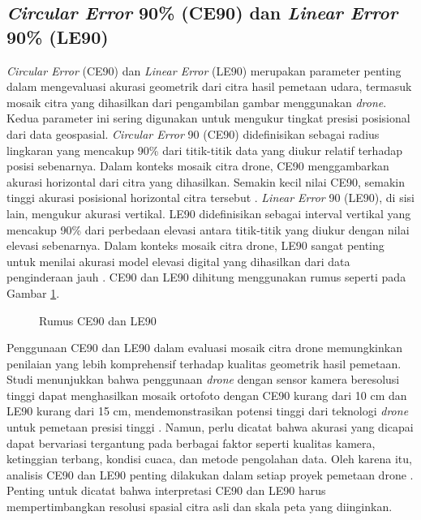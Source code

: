 \subsection{\textit{Circular Error} 90\% (CE90) dan \textit{Linear Error} 90\% (LE90)}

    \textit{Circular Error} (CE90) dan \textit{Linear Error} (LE90) merupakan parameter penting dalam mengevaluasi akurasi geometrik dari citra hasil pemetaan udara, termasuk mosaik citra yang dihasilkan dari pengambilan gambar menggunakan \textit{drone}. Kedua parameter ini sering digunakan untuk mengukur tingkat presisi posisional dari data geospasial. \textit{Circular Error} 90 (CE90) didefinisikan sebagai radius lingkaran yang mencakup 90\% dari titik-titik data yang diukur relatif terhadap posisi sebenarnya. Dalam konteks mosaik citra drone, CE90 menggambarkan akurasi horizontal dari citra yang dihasilkan. Semakin kecil nilai CE90, semakin tinggi akurasi posisional horizontal citra tersebut \citep{peppa2019photogrammetric}. \textit{Linear Error} 90 (LE90), di sisi lain, mengukur akurasi vertikal. LE90 didefinisikan sebagai interval vertikal yang mencakup 90\% dari perbedaan elevasi antara titik-titik yang diukur dengan nilai elevasi sebenarnya. Dalam konteks mosaik citra drone, LE90 sangat penting untuk menilai akurasi model elevasi digital yang dihasilkan dari data penginderaan jauh \citep{wolf2002elementary}. CE90 dan LE90 dihitung menggunakan rumus seperti pada Gambar \ref{rumus_ce}.

    \begin{figure}[H]
    \centering
    \caption{Rumus CE90 dan LE90 \citep{BIG2014}}
    \label{rumus_ce}
    \end{figure}

    Penggunaan CE90 dan LE90 dalam evaluasi mosaik citra drone memungkinkan penilaian yang lebih komprehensif terhadap kualitas geometrik hasil pemetaan. Studi menunjukkan bahwa penggunaan \textit{drone} dengan sensor kamera beresolusi tinggi dapat menghasilkan mosaik ortofoto dengan CE90 kurang dari 10 cm dan LE90 kurang dari 15 cm, mendemonstrasikan potensi tinggi dari teknologi \textit{drone} untuk pemetaan presisi tinggi \citep{kalantar2017drone}. Namun, perlu dicatat bahwa akurasi yang dicapai dapat bervariasi tergantung pada berbagai faktor seperti kualitas kamera, ketinggian terbang, kondisi cuaca, dan metode pengolahan data. Oleh karena itu, analisis CE90 dan LE90 penting dilakukan dalam setiap proyek pemetaan drone \citep{sanz2018accuracy}. Penting untuk dicatat bahwa interpretasi CE90 dan LE90 harus mempertimbangkan resolusi spasial citra asli dan skala peta yang diinginkan.

